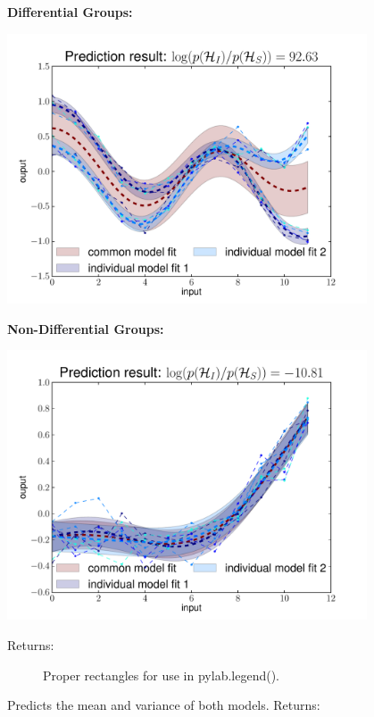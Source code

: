 \documentclass[letterpaper,10pt,english]{sphinxmanual}
\begin{document}
\begin{fulllineitems}
\begin{fulllineitems}
\begin{description}
\end{description}

\textbf{Differential Groups:}

\includegraphics[height=8cm]{plotGPTwoSampleDifferential.pdf}

\textbf{Non-Differential Groups:}

\includegraphics[height=8cm]{plotGPTwoSampleSame.pdf}
\begin{description}
\item[{Returns:}] \leavevmode
Proper rectangles for use in pylab.legend().

\end{description}

\end{fulllineitems}


\begin{fulllineitems}
\label{base:gptwosample.twosample.twosample_base.TwoSampleBase.predict_mean_variance}
Predicts the mean and variance of both models.
Returns:


\end{fulllineitems}
\end{fulllineitems}
\end{document}
